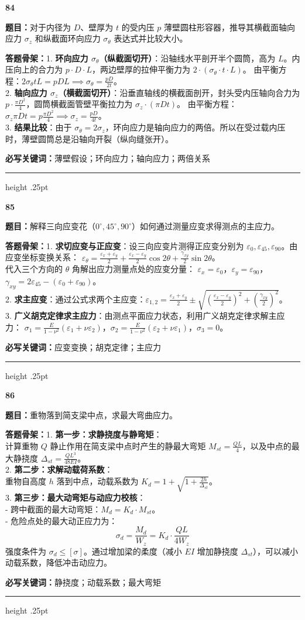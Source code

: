 \documentclass[a4paper,10pt]{article}
\newcommand{\qitem}[5]{%
\Needspace{6\baselineskip}
\vspace{3pt}
{\Large\bfseries\color{deep} #1}\quad{\bfseries\color{orangea}#2}\par
\textbf{题目：}#3\par
\textbf{答题骨架：}#4\par
\textbf{必写关键词：}{\color{bluea}#5}\par
\vspace{2pt}\hrule height .25pt
}
\begin{document}
\qitem{84}{薄壁圆筒}
{对于内径为 \(D\)、壁厚为 \(t\) 的受内压 \(p\) 薄壁圆柱形容器，推导其横截面轴向应力 \(\sigma_z\) 和纵截面环向应力 \(\sigma_\theta\) 表达式并比较大小。}
{1. \textbf{环向应力 \(\sigma_\theta\)（纵截面切开）}：沿轴线水平剖开半个圆筒，高为 \(L\)。内压向上的合力为 \(p \cdot D \cdot L\)，两边壁厚的拉伸平衡力为 \(2 \cdot (\sigma_\theta \cdot t \cdot L)\)。
   由平衡方程：\(2 \sigma_\theta t L = p D L \implies \sigma_\theta = \frac{p D}{2t}\)。\\
2. \textbf{轴向应力 \(\sigma_z\)（横截面切开）}：沿垂直轴线的横截面剖开，封头受内压轴向合力为 \(p \cdot \frac{\pi D^2}{4}\)，圆筒横截面管壁平衡拉力为 \(\sigma_z \cdot (\pi D t)\)。
   由平衡方程：\(\sigma_z \pi D t = p \frac{\pi D^2}{4} \implies \sigma_z = \frac{p D}{4t}\)。\\
3. \textbf{结果比较}：由于 \(\sigma_\theta = 2 \sigma_z\)，环向应力是轴向应力的两倍。所以在受过载内压时，薄壁圆筒总是沿轴向开裂（纵向缝张开）。}
{薄壁假设；环向应力；轴向应力；两倍关系}

\qitem{85}{应变花}
{解释三向应变花（\(0^\circ, 45^\circ, 90^\circ\)）如何通过测量应变求得测点的主应力。}
{1. \textbf{求切应变与正应变}：设三向应变片测得正应变分别为 \(\varepsilon_0, \varepsilon_{45}, \varepsilon_{90}\)。由应变坐标变换关系：
   \(\varepsilon_\theta = \frac{\varepsilon_x + \varepsilon_y}{2} + \frac{\varepsilon_x - \varepsilon_y}{2}\cos 2\theta + \frac{\gamma_{xy}}{2}\sin 2\theta\)。\\
   代入三个方向的 \(\theta\) 角解出应力测量点处的应变分量：
   \(\varepsilon_x = \varepsilon_0\)，\(\varepsilon_y = \varepsilon_{90}\)，\(\gamma_{xy} = 2\varepsilon_{45} - (\varepsilon_0 + \varepsilon_{90})\)。\\
2. \textbf{求主应变}：通过公式求两个主应变：\(\varepsilon_{1,2} = \frac{\varepsilon_x + \varepsilon_y}{2} \pm \sqrt{(\frac{\varepsilon_x - \varepsilon_y}{2})^2 + (\frac{\gamma_{xy}}{2})^2}\)。\\
3. \textbf{广义胡克定律求主应力}：由测点平面应力状态，利用广义胡克定律求解主应力：
   \(\sigma_1 = \frac{E}{1-\nu^2}(\varepsilon_1 + \nu \varepsilon_2)\)，\(\sigma_2 = \frac{E}{1-\nu^2}(\varepsilon_2 + \nu \varepsilon_1)\)，\(\sigma_3 = 0\)。}
{应变变换；胡克定律；主应力}

\qitem{86}{冲击 + 梁弯曲}
{重物落到简支梁中点，求最大弯曲应力。}
{1. \textbf{第一步：求静挠度与静弯矩}：\\
   计算重物 \(Q\) 静止作用在简支梁中点时产生的静最大弯矩 \(M_{st} = \frac{Q L}{4}\)，以及中点的最大静挠度 \(\Delta_{st} = \frac{Q L^3}{48 EI}\)。\\
2. \textbf{第二步：求解动载荷系数}：\\
   重物自高度 \(h\) 落到中点，动载系数为 \(K_d = 1 + \sqrt{1 + \frac{2h}{\Delta_{st}}}\)。\\
3. \textbf{第三步：最大动弯矩与动应力校核}：\\
   - 跨中截面的最大动弯矩：\(M_d = K_d \cdot M_{st}\)。\\
   - 危险点处的最大动正应力为：
     \[ \sigma_d = \frac{M_d}{W_z} = K_d \cdot \frac{Q L}{4 W_z} \]
     强度条件为 \(\sigma_d \le [\sigma]\)。通过增加梁的柔度（减小 \(EI\) 增加静挠度 \(\Delta_{st}\)），可以减小动载系数，降低冲击动应力。}
{静挠度；动载系数；最大弯矩}
\end{document}
